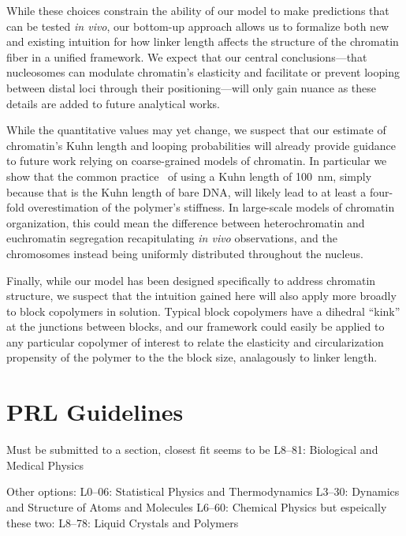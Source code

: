 \documentclass[%
 reprint,
superscriptaddress,
showpacs,preprintnumbers,
 amsmath,amssymb,
 aps,
 prl,
]{revtex4-1}
\begin{document}
While these choices constrain the ability of our model to make predictions that
    can be tested \textit{in vivo}, our bottom-up approach allows us to
    formalize both new and existing intuition for how linker length affects the
    structure of the chromatin fiber in a unified framework.
We expect that our central conclusions---that nucleosomes can modulate
    chromatin's elasticity and facilitate or prevent looping between distal loci
    through their positioning---will only gain nuance as these details are added
    to future analytical works.

While the quantitative values may yet change, we suspect that our estimate of
    chromatin's Kuhn length and looping probabilities will already provide
    guidance to future work relying on coarse-grained models of chromatin.
In particular we show that the common practice~\cite{macphersonInPress,nuebler2018}
    of using a Kuhn length of \SI{100}{\nano\metre}, simply because that is the
    Kuhn length of bare DNA, will likely lead to at least a four-fold
    overestimation of the polymer's stiffness.
In large-scale models of chromatin organization, this could mean the difference
    between heterochromatin and euchromatin segregation recapitulating
    \textit{in vivo} observations, and the chromosomes instead being uniformly
    distributed throughout the nucleus.

Finally, while our model has been designed specifically to address chromatin
    structure, we suspect that the intuition gained here will also apply more
    broadly to block copolymers in solution.
Typical block copolymers have a dihedral ``kink'' at the junctions between
    blocks, and our framework could easily be applied to any particular
    copolymer of interest to relate the elasticity and circularization
    propensity of the polymer to the the block size, analagously to linker
    length.


\section{PRL Guidelines}

Must be submitted to a section, closest fit seems to be
L8--81: Biological and Medical Physics

Other options:
L0--06: Statistical Physics and Thermodynamics
L3--30: Dynamics and Structure of Atoms and Molecules
L6--60: Chemical Physics
but espeically these two:
L8--78: Liquid Crystals and Polymers
\end{document}
